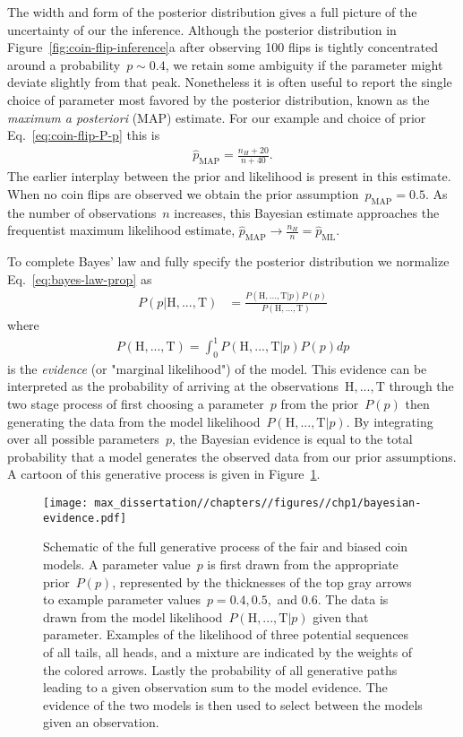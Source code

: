 The width and form of the posterior distribution gives a full picture of the uncertainty of our the inference. Although the posterior distribution in Figure~\ref{fig:coin-flip-inference}a after observing 100 flips is tightly concentrated around a probability~$p \sim 0.4$, we retain some ambiguity if the parameter might deviate slightly from that peak. Nonetheless it is often useful to report the single choice of parameter most favored by the posterior distribution, known as the \emph{maximum a posteriori} (MAP) estimate. For our example and choice of prior Eq.~\eqref{eq:coin-flip-P-p} this is \begin{align}
    \hat{p}_{\text{MAP}} = \frac{n_H + 20}{n + 40}. \label{eq:coin-flip-p-MAP}
\end{align}
The earlier interplay between the prior and likelihood is present in this estimate. When no coin flips are observed we obtain the prior assumption~$\hat{p}_{\text{MAP}} = 0.5$. As the number of observations~$n$ increases, this Bayesian estimate approaches the frequentist maximum likelihood estimate, $\hat{p}_{\text{MAP}} \rightarrow \frac{n_H}{n} = \hat{p}_{\text{ML}}$. 

To complete Bayes' law and fully specify the posterior distribution we normalize Eq.~\eqref{eq:bayes-law-prop} as 
\begin{align}
    P(p|\text{H},...,\text{T}) &= \frac{P(\text{H},...,\text{T}|p)P(p)}{P(\text{H},...,\text{T})} \label{eq:bayes-law} 
\end{align}
where \begin{align}
    P(\text{H},...,\text{T}) = \int_0^1 P(\text{H},...,\text{T}|p)P(p) dp
\end{align}
is the \emph{evidence} (or "marginal likelihood") of the model. This evidence can be interpreted as the probability of arriving at the observations~$\text{H},...,\text{T}$ through the two stage process of first choosing a parameter~$p$ from the prior~$P(p)$ then generating the data from the model likelihood~$P(\text{H},...,\text{T}|p)$. By integrating over all possible parameters~$p$, the Bayesian evidence is equal to the total probability that a model generates the observed data from our prior assumptions. A cartoon of this generative process is given in Figure~\ref{fig:bayesian-evidence}.

\begin{figure}
    \centering
    \texttt{[image: max\_dissertation//chapters//figures//chp1/bayesian-evidence.pdf]}
    \caption{Schematic of the full generative process of the fair and biased coin models. A parameter value~$p$ is first drawn from the appropriate prior~$P(p)$, represented by the thicknesses of the top gray arrows to example parameter values~$p = 0.4, 0.5,$ and $0.6$. The data is drawn from the model likelihood~$P(\text{H},...,\text{T}|p)$ given that parameter. Examples of the likelihood of three potential sequences of all tails, all heads, and a mixture are indicated by the weights of the colored arrows. Lastly the probability of all generative paths leading to a given observation sum to the model evidence. The evidence of the two models is then used to select between the models given an observation. }
    \label{fig:bayesian-evidence}
\end{figure}

